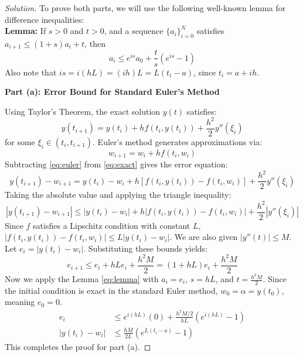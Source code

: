 \documentclass[11pt, a4paper]{article}
\newif\ifsolutionnewpage
\newenvironment{solution}
  {\begin{proof}[Solution]}
  {\end{proof}\ifsolutionnewpage\newpage\fi}
\begin{document}
    \begin{solution}
    To prove both parts, we will use the following well-known lemma for difference inequalities: \\
    \textbf{Lemma:} If $s > 0$ and $t > 0$, and a sequence $\{a_i\}_{i=0}^N$ satisfies $a_{i+1} \le (1+s)a_i + t$, then
    \begin{equation} \label{eq:lemma}
    a_i \le e^{is}a_0 + \frac{t}{s}(e^{is}-1)
    \end{equation}
    Also note that $is = i(hL) = (ih)L = L(t_i - a)$, since $t_i = a + ih$.
    
    \vspace{0.3cm}
    \textbf{Part (a): Error Bound for Standard Euler's Method}
    
    Using Taylor's Theorem, the exact solution $y(t)$ satisfies:
    \begin{equation} \label{eq:exact}
    y(t_{i+1}) = y(t_i) + h f(t_i, y(t_i)) + \frac{h^2}{2} y''(\xi_i)
    \end{equation}
    for some $\xi_i \in (t_i, t_{i+1})$. Euler's method generates approximations via:
    \begin{equation} \label{eq:euler}
    w_{i+1} = w_i + h f(t_i, w_i)
    \end{equation}
    Subtracting \eqref{eq:euler} from \eqref{eq:exact} gives the error equation:
    \begin{equation*}
    y(t_{i+1}) - w_{i+1} = y(t_i) - w_i + h [f(t_i, y(t_i)) - f(t_i, w_i)] + \frac{h^2}{2} y''(\xi_i)
    \end{equation*}
    Taking the absolute value and applying the triangle inequality:
    \begin{equation*}
    |y(t_{i+1}) - w_{i+1}| \le |y(t_i) - w_i| + h |f(t_i, y(t_i)) - f(t_i, w_i)| + \frac{h^2}{2} |y''(\xi_i)|
    \end{equation*}
    Since $f$ satisfies a Lipschitz condition with constant $L$, $|f(t_i, y(t_i)) - f(t_i, w_i)| \le L|y(t_i) - w_i|$. We are also given $|y''(t)| \le M$. Let $e_i = |y(t_i) - w_i|$. Substituting these bounds yields:
    \begin{equation*}
    e_{i+1} \le e_i + hL e_i + \frac{h^2 M}{2} = (1 + hL)e_i + \frac{h^2 M}{2}
    \end{equation*}
    Now we apply the Lemma \eqref{eq:lemma} with $a_i = e_i$, $s = hL$, and $t = \frac{h^2 M}{2}$.
    Since the initial condition is exact in the standard Euler method, $w_0 = \alpha = y(t_0)$, meaning $e_0 = 0$.
    \begin{align*}
    e_i &\le e^{i(hL)}(0) + \frac{h^2 M / 2}{hL} (e^{i(hL)} - 1) \\
    |y(t_i) - w_i| &\le \frac{hM}{2L} (e^{L(t_i - a)} - 1)
    \end{align*}
    This completes the proof for part (a).
    

\end{solution}
\end{document}
